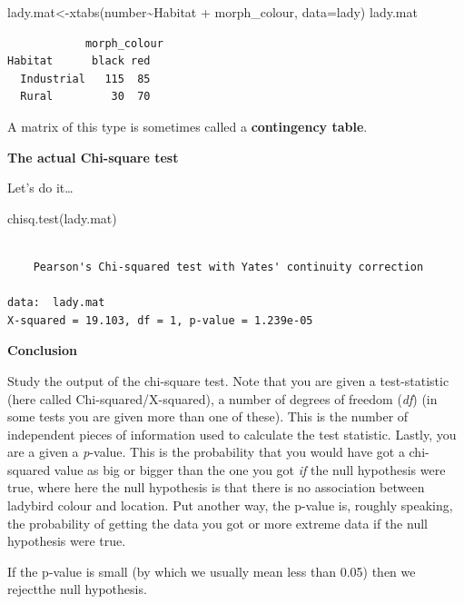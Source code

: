 \documentclass[
  letterpaper,
  DIV=11,
  numbers=noendperiod]{scrreprt}
\newenvironment{Shaded}{\begin{snugshade}}{\end{snugshade}}
\newcommand{\AttributeTok}[1]{\textcolor[rgb]{0.40,0.45,0.13}{#1}}
\newcommand{\FunctionTok}[1]{\textcolor[rgb]{0.28,0.35,0.67}{#1}}
\newcommand{\NormalTok}[1]{\textcolor[rgb]{0.00,0.23,0.31}{#1}}
\newcommand{\OtherTok}[1]{\textcolor[rgb]{0.00,0.23,0.31}{#1}}
\newcommand{\SpecialCharTok}[1]{\textcolor[rgb]{0.37,0.37,0.37}{#1}}
\begin{document}
\begin{Shaded}
\begin{Highlighting}[]
\NormalTok{lady.mat}\OtherTok{\textless{}{-}}\FunctionTok{xtabs}\NormalTok{(number}\SpecialCharTok{\textasciitilde{}}\NormalTok{Habitat }\SpecialCharTok{+}\NormalTok{ morph\_colour, }\AttributeTok{data=}\NormalTok{lady)}
\NormalTok{lady.mat}
\end{Highlighting}
\end{Shaded}

\begin{verbatim}
            morph_colour
Habitat      black red
  Industrial   115  85
  Rural         30  70
\end{verbatim}

A matrix of this type is sometimes called a \textbf{contingency table}.

\textbf{The actual Chi-square test}

Let's do it\ldots{}

\begin{Shaded}
\begin{Highlighting}[]
\FunctionTok{chisq.test}\NormalTok{(lady.mat)}
\end{Highlighting}
\end{Shaded}

\begin{verbatim}

    Pearson's Chi-squared test with Yates' continuity correction

data:  lady.mat
X-squared = 19.103, df = 1, p-value = 1.239e-05
\end{verbatim}

\textbf{Conclusion}

Study the output of the chi-square test. Note that you are given a
test-statistic (here called Chi-squared/X-squared), a number of degrees
of freedom (\emph{df}) (in some tests you are given more than one of
these). This is the number of independent pieces of information used to
calculate the test statistic. Lastly, you are a given a \emph{p}-value.
This is the probability that you would have got a chi-squared value as
big or bigger than the one you got \emph{if} the null hypothesis were
true, where here the null hypothesis is that there is no association
between ladybird colour and location. Put another way, the p-value is,
roughly speaking, the probability of getting the data you got or more
extreme data if the null hypothesis were true.

If the p-value is small (by which we usually mean less than 0.05) then
we rejectthe null hypothesis.
\end{document}
